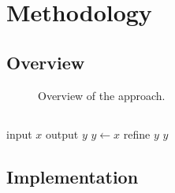 \chapter{Methodology}\label{ch:method}

\section{Overview}\label{sec:overview}

\begin{figure}[htbp]
  \centering
  \caption{Overview of the approach. }
  \label{fig:overview}
\end{figure}

\section{}\label{sec:component-1}

\begin{algorithm}[htbp]
  \caption{}\label{alg:main}
  \begin{algorithmic}[1]
    \Require input $x$
    \Ensure output $y$
    \State $y \gets x$
      \State refine $y$
    \EndWhile
    \State \Return $y$
  \end{algorithmic}
\end{algorithm}

\section{Implementation}\label{sec:implementation}
